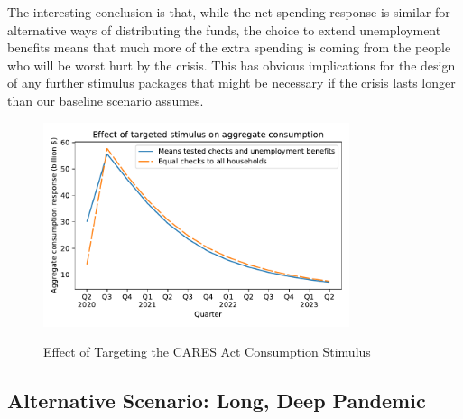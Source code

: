 \documentclass[titlepage,letterpaper]{\econtex}
\begin{document}
The interesting conclusion is that, while the net spending response is similar for alternative ways of distributing the funds, the choice to extend unemployment benefits means that much more of the extra spending is coming from the people who will be worst hurt by the crisis.  This has obvious implications for the design of any further stimulus packages that might be necessary if the crisis lasts longer than our baseline scenario assumes.

\begin{figure}
  \centering
  \caption{Effect of Targeting the CARES Act Consumption Stimulus}
  \label{EffectTargeting}
  { \includegraphics[width=0.8\textwidth]{./Figures/EffectTargeting}}
\end{figure}


\subsection{Alternative Scenario: Long, Deep Pandemic} \label{sec:longPandemic}
\end{document}
